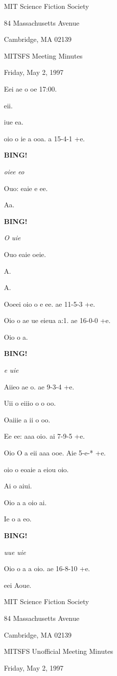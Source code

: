 \documentclass[12pt]{article}
\newcommand{\bing}{{\bf BING!} }
\newcommand{\goto}[1]{\bing \vskip 12pt \centerline{{\em{#1}}}}
\begin{document}
\begin{center}

MIT Science Fiction Society 

84 Massachusetts Avenue

Cambridge, MA 02139

\vspace{12pt}

MITSFS Meeting Minutes 

Friday, May 2, 1997

\end{center}
 
\vspace{18pt}

\setlength{\parskip}{6pt}

\noindent
Eei ae o oe 17:00.

eii.

iue ea.

oio o ie a ooa. a 15-4-1 +e.

\goto{oiee eo}

Ouo: eaie e ee.

Aa.

\goto{O uie}

Ouo eaie oeie.

A.

A.

Ooeei oio o e ee. ae 11-5-3 +e.

Oio o ae ue eieua a:1. ae 16-0-0 +e.

Oio o a.

\goto{e uie}

Aiieo ae o. ae 9-3-4 +e.

Uii o eiiio o o oo.

Oaiiie a ii o oo.

Ee ee: aaa oio. ai 7-9-5 +e.

Oio O a eii aaa ooe. Aie 5-e-* +e.

oio o eoaie a eiou oio.

Ai o aiui.

Oio a a oio ai.

Ie o a eo.

\goto{uue uie}

Oio o a a oio. ae 16-8-10 +e.

\vspace{12pt}

\noindent
eei Aoue.

\begin{center}

MIT Science Fiction Society 

84 Massachusetts Avenue

Cambridge, MA 02139

\vspace{12pt}

MITSFS Unofficial Meeting Minutes 

Friday, May 2, 1997

\end{center}
 
\end{document}
